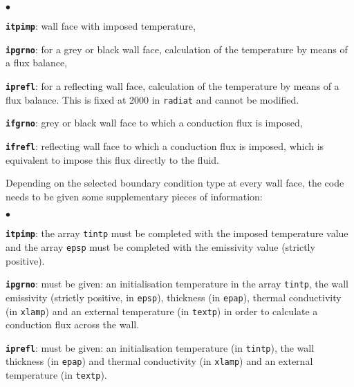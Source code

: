 {{\begin{list}{$\bullet$}{}

\item \texttt{\textbf{itpimp}}: wall face with imposed temperature,

\item \texttt{\textbf{ipgrno}}: for a grey or black wall face, calculation of the
      temperature by means of a flux balance,

\item \texttt{\textbf{iprefl}}: for a reflecting wall face, calculation of the
      temperature by means of a flux balance.
 This is fixed at 2000 in \texttt{radiat} and cannot be modified.

\item \texttt{\textbf{ifgrno}}: grey or black wall face to which a conduction
      flux is imposed,

\item \texttt{\textbf{ifrefl}}: reflecting wall face to which a conduction
      flux is imposed, which is equivalent to impose this flux directly
      to the fluid.

\end{list}

\noindent
Depending on the selected boundary condition type at every wall face,
the code needs to be given some supplementary pieces of information:

\begin{list}{$\bullet$}{}

\item \texttt{\textbf{itpimp}}: the array \texttt{tintp} must be completed
      with the imposed temperature value and the array \texttt{epsp} must
      be completed with the emissivity value (strictly positive).

\item \texttt{\textbf{ipgrno}}: must be given: an initialisation temperature in
      the array \texttt{tintp}, the wall emissivity (strictly positive, in
      \texttt{epsp}), thickness (in \texttt{epap}), thermal conductivity
      (in \texttt{xlamp}) and an external temperature (in \texttt{textp})
      in order to calculate a conduction flux across the wall.

\item \texttt{\textbf{iprefl}}: must be given: an initialisation temperature (in
      \texttt{tintp}), the wall thickness (in \texttt{epap}) and thermal conductivity (in
      \texttt{xlamp}) and an external temperature (in \texttt{textp}).


\end{list}}}
